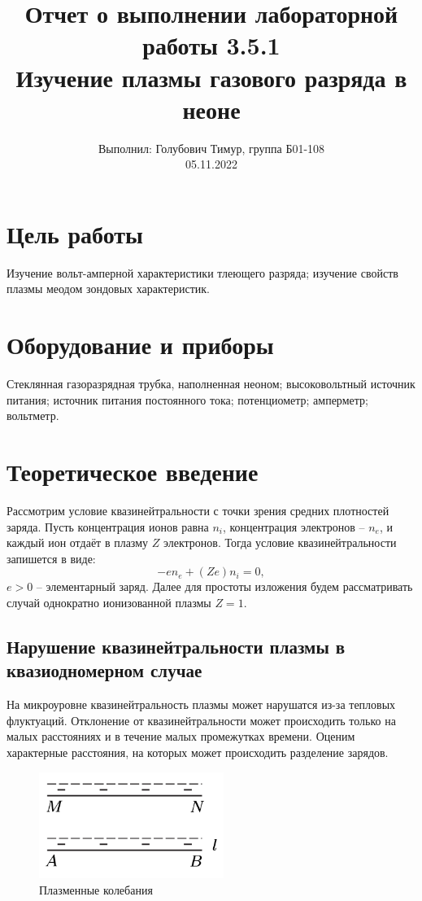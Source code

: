\documentclass[12pt,a4paper]{article}
\author{\normalsize Выполнил: Голубович Тимур, группа Б01-108 \\
	\normalsize 05.11.2022}
\date{}
\title{
	\large Отчет о выполнении лабораторной работы 3.5.1 \\
	\Large Изучение плазмы газового разряда в неоне\\ 
	
}
\begin{document}
	\maketitle
	
\section*{Цель работы}
Изучение вольт-амперной характеристики тлеющего разряда; изучение свойств плазмы меодом зондовых характеристик.


\section*{Оборудование и приборы} 
Стеклянная газоразрядная трубка, наполненная неоном;
высоковольтный источник питания;
источник питания постоянного тока;
потенциометр;
амперметр;
вольтметр.

	
\section*{Теоретическое введение}

    Рассмотрим условие квазинейтральности с точки зрения средних плотностей заряда. Пусть концентрация ионов равна $n_i$, концентрация электронов -- $n_e$, и каждый ион отдаёт в плазму $Z$ электронов. Тогда условие квазинейтральности запишется в виде:
    $$
    -en_e + (Ze) n_i = 0, 
    $$
    $e > 0$ -- элементарный заряд. Далее для простоты изложения будем рассматривать случай однократно ионизованной плазмы $Z = 1$.
    
    \subsection*{Нарушение квазинейтральности плазмы в квазиодномерном случае}
    
    На микроуровне квазинейтральность плазмы может нарушатся из-за тепловых флуктуаций. Отклонение от квазинейтральности может происходить только на малых расстояниях и в течение малых промежутках времени. Оценим характерные расстояния, на которых может происходить разделение зарядов.
    
    \begin{figure}
    	\centering
    	\includegraphics[width=6cm]{res/plasma.png}
    	\caption{Плазменные колебания}
    	\label{img:plasma oscil}
    \end{figure}
    
\end{document}
